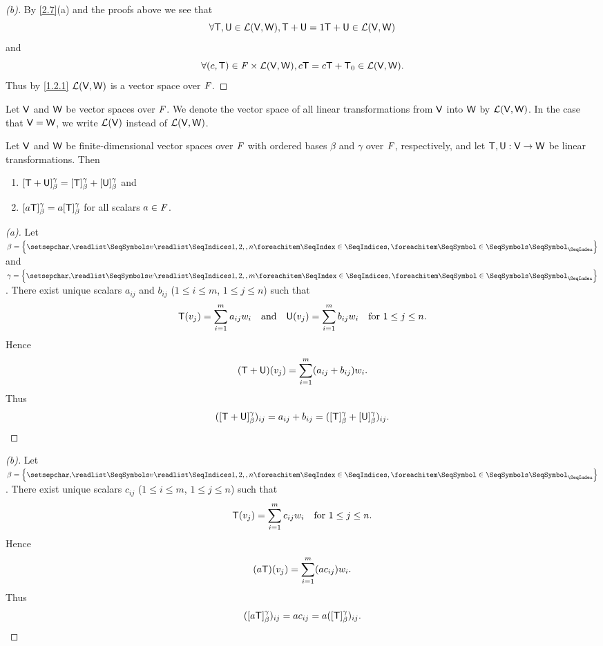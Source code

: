 \begin{proof}[(b)]
  By \cref{2.7}(a) and the proofs above we see that
  \[
    \forall \mathsf{T}, \mathsf{U} \in \mathcal{L}(\mathsf{V}, \mathsf{W}), \mathsf{T} + \mathsf{U} = 1 \mathsf{T} + \mathsf{U} \in \mathcal{L}(\mathsf{V}, \mathsf{W})
  \]
  and
  \[
    \forall (c, \mathsf{T}) \in \mathit{F} \times \mathcal{L}(\mathsf{V}, \mathsf{W}), c \mathsf{T} = c \mathsf{T} + \mathsf{T}_0 \in \mathcal{L}(\mathsf{V}, \mathsf{W}).
  \]
  Thus by \cref{1.2.1} \(\mathcal{L}(\mathsf{V}, \mathsf{W})\) is a vector space over \(\mathit{F}\).
\end{proof}

\begin{defn}\label{2.2.6}
  Let \(\mathsf{V}\) and \(\mathsf{W}\) be vector spaces over \(\mathit{F}\).
  We denote the vector space of all linear transformations from \(\mathsf{V}\) into \(\mathsf{W}\) by \(\mathcal{L}(\mathsf{V}, \mathsf{W})\).
  In the case that \(\mathsf{V} = \mathsf{W}\), we write \(\mathcal{L}(\mathsf{V})\) instead of \(\mathcal{L}(\mathsf{V}, \mathsf{W})\).
\end{defn}

\begin{thm}\label{2.8}
  Let \(\mathsf{V}\) and \(\mathsf{W}\) be finite-dimensional vector spaces over \(\mathit{F}\) with ordered bases \(\beta\) and \(\gamma\) over \(\mathit{F}\), respectively, and let \(\mathsf{T}, \mathsf{U} : \mathsf{V} \to \mathsf{W}\) be linear transformations.
  Then
  \begin{enumerate}
    \item \([\mathsf{T} + \mathsf{U}]_{\beta}^{\gamma} = [\mathsf{T}]_{\beta}^{\gamma} + [\mathsf{U}]_{\beta}^{\gamma}\) and
    \item \([a \mathsf{T}]_{\beta}^{\gamma} = a [\mathsf{T}]_{\beta}^{\gamma}\) for all scalars \(a \in \mathit{F}\).
  \end{enumerate}
\end{thm}

\begin{proof}[(a)]
  Let \(\beta = \set{\seq{v}{1,2,,n}}\) and \(\gamma = \set{\seq{w}{1,2,,m}}\).
  There exist unique scalars \(a_{i j}\) and \(b_{i j}\) (\(1 \leq i \leq m\), \(1 \leq j \leq n\)) such that
  \[
    \mathsf{T}(v_j) = \sum_{i = 1}^m a_{i j} w_i \quad \text{and} \quad \mathsf{U}(v_j) = \sum_{i = 1}^m b_{i j} w_i \quad \text{for } 1 \leq j \leq n.
  \]
  Hence
  \[
    (\mathsf{T} + \mathsf{U})(v_j) = \sum_{i = 1}^m (a_{i j} + b_{i j}) w_i.
  \]
  Thus
  \[
    ([\mathsf{T} + \mathsf{U}]_{\beta}^{\gamma})_{i j} = a_{i j} + b_{i j} = ([\mathsf{T}]_{\beta}^{\gamma} + [\mathsf{U}]_{\beta}^{\gamma})_{i j}.
  \]
\end{proof}

\begin{proof}[(b)]
  Let \(\beta = \set{\seq{v}{1,2,,n}}\).
  There exist unique scalars \(c_{i j}\) (\(1 \leq i \leq m\), \(1 \leq j \leq n\)) such that
  \[
    \mathsf{T}(v_j) = \sum_{i = 1}^m c_{i j} w_i \quad \text{for } 1 \leq j \leq n.
  \]
  Hence
  \[
    (a \mathsf{T})(v_j) = \sum_{i = 1}^m (a c_{i j}) w_i.
  \]
  Thus
  \[
    ([a \mathsf{T}]_{\beta}^{\gamma})_{i j} = a c_{i j} = a ([\mathsf{T}]_{\beta}^{\gamma})_{i j}.
  \]
\end{proof}

